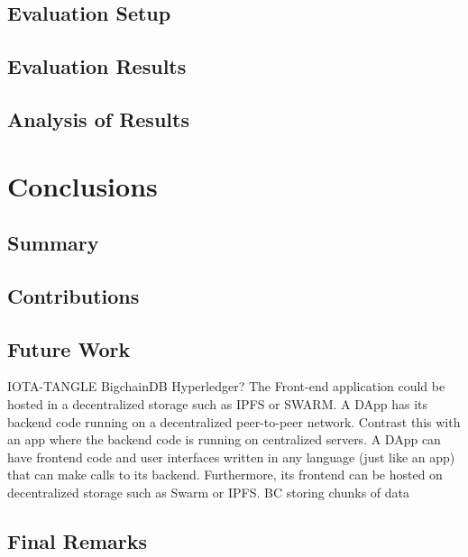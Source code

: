 \section{Evaluation Setup}

\section{Evaluation Results}

\section{Analysis of Results}


\chapter{Conclusions}
\label{ch:closure}


\section{Summary}

\section{Contributions}

\section{Future Work}

IOTA-TANGLE
BigchainDB
Hyperledger?
The Front-end application could be hosted in a decentralized storage such as IPFS or SWARM.
A DApp has its backend code running on a decentralized peer-to-peer network. Contrast this with an app where the backend code is running on centralized servers. A DApp can have frontend code and user interfaces written in any language (just like an app) that can make calls to its backend. Furthermore, its frontend can be hosted on decentralized storage such as Swarm or IPFS.
BC storing chunks of data

\section{Final Remarks}
